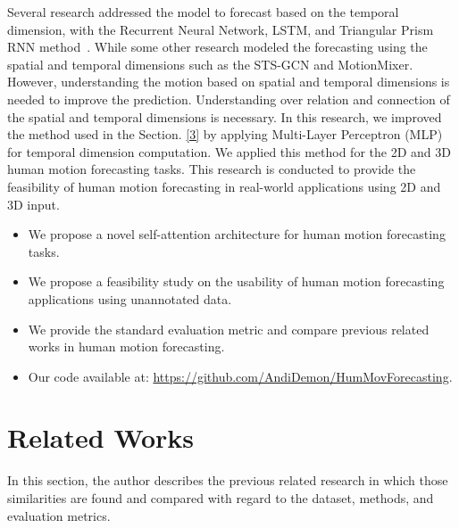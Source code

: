 Several research addressed the model to forecast based on the temporal dimension, with the Recurrent Neural Network\cite{fragkiadaki2015recurrent}, LSTM\cite{fragkiadaki2015recurrent, lstm}, and Triangular Prism RNN method~\cite{chiu2019}. While some other research modeled the forecasting using the spatial and temporal dimensions such as the STS-GCN\cite{Sofianos2021} and MotionMixer\cite{motionmixer2022}. However, understanding the motion based on spatial and temporal dimensions is needed to improve the prediction. Understanding over relation and connection of the spatial and temporal dimensions is necessary.
In this research, we improved the method used in the Section. \ref{3} by applying Multi-Layer Perceptron (MLP) for temporal dimension computation. We applied this method for the 2D and 3D human motion forecasting tasks. This research is conducted to provide the feasibility of human motion forecasting in real-world applications using 2D and 3D input.
\begin{itemize}
    \item We propose a novel self-attention architecture for human motion forecasting tasks.
    \item We propose a feasibility study on the usability of human motion forecasting applications using unannotated data.
    \item We provide the standard evaluation metric and compare previous related works in human motion forecasting.
    \item Our code available at: \href{https://github.com/AndiDemon/HumMovForecasting}{https://github.com/AndiDemon/HumMovForecasting}.
\end{itemize}


\section{Related Works}\label{4:related_workd}
In this section, the author describes the previous related research in which those similarities are found and compared with regard to the dataset, methods, and evaluation metrics. 

